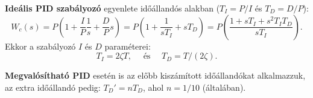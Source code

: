 \textbf{Ideális PID szabályozó} egyenlete időállandós alakban
($T_I = P / I$ és $T_D = D / P$):
\begin{equation}
  W_c(s)
  = P \left( 1 + \frac{I}{P}\frac{1}{s} + \frac{D}{P}s \right)
  = P \left( 1 + \frac{1}{sT_I} + sT_D \right)
  = P \left( \frac{1 + sT_I + s^2 T_I T_D}{sT_I} \right)
  .
  \label{eq:PID-T}
\end{equation}
Ekkor a szabályozó $I$ és $D$ paraméterei:
\begin{equation}
  T_I  = 2 \zeta T
  , \quad \text{ és } \quad
  T_D = T / (2\zeta).
  \label{eq:PID-ID}
\end{equation}

\textbf{Megvalósítható PID} esetén is az előbb kiszámított időállandókat
alkalmazzuk, az extra időállandó pedig: $T_D' = nT_D$, ahol $n = 1 / 10$
(általában).
